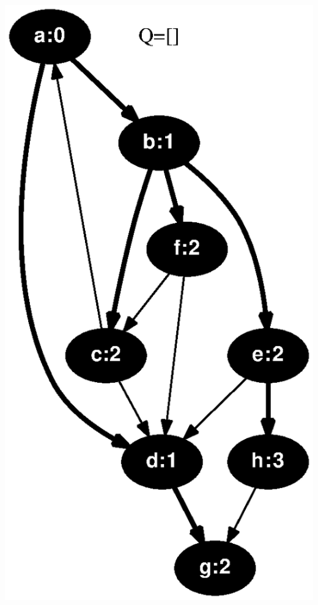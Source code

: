 \documentclass{article}
\begin{document}
\includegraphics[height=.3\textheight]{bfs_directed_classroom_08.eps}
\vspace{1em}
\HR
\end{document}
